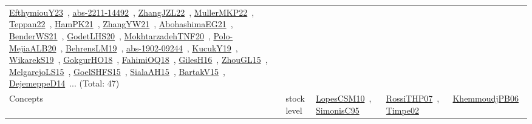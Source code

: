{\begin{longtable}{lp{3cm}>{\raggedright\arraybackslash}p{6cm}>{\raggedright\arraybackslash}p{6cm}>{\raggedright\arraybackslash}p{8cm}}
\href{works/EfthymiouY23.pdf}{EfthymiouY23}~\cite{EfthymiouY23}, \href{works/abs-2211-14492.pdf}{abs-2211-14492}~\cite{abs-2211-14492}, \href{works/ZhangJZL22.pdf}{ZhangJZL22}~\cite{ZhangJZL22}, \href{works/MullerMKP22.pdf}{MullerMKP22}~\cite{MullerMKP22}, \href{works/Teppan22.pdf}{Teppan22}~\cite{Teppan22}, \href{works/HamPK21.pdf}{HamPK21}~\cite{HamPK21}, \href{works/ZhangYW21.pdf}{ZhangYW21}~\cite{ZhangYW21}, \href{works/AbohashimaEG21.pdf}{AbohashimaEG21}~\cite{AbohashimaEG21}, \href{works/BenderWS21.pdf}{BenderWS21}~\cite{BenderWS21}, \href{works/GodetLHS20.pdf}{GodetLHS20}~\cite{GodetLHS20}, \href{works/MokhtarzadehTNF20.pdf}{MokhtarzadehTNF20}~\cite{MokhtarzadehTNF20}, \href{works/Polo-MejiaALB20.pdf}{Polo-MejiaALB20}~\cite{Polo-MejiaALB20}, \href{works/BehrensLM19.pdf}{BehrensLM19}~\cite{BehrensLM19}, \href{works/abs-1902-09244.pdf}{abs-1902-09244}~\cite{abs-1902-09244}, \href{works/KucukY19.pdf}{KucukY19}~\cite{KucukY19}, \href{works/WikarekS19.pdf}{WikarekS19}~\cite{WikarekS19}, \href{works/GokgurHO18.pdf}{GokgurHO18}~\cite{GokgurHO18}, \href{works/FahimiOQ18.pdf}{FahimiOQ18}~\cite{FahimiOQ18}, \href{works/GilesH16.pdf}{GilesH16}~\cite{GilesH16}, \href{works/ZhouGL15.pdf}{ZhouGL15}~\cite{ZhouGL15}, \href{works/MelgarejoLS15.pdf}{MelgarejoLS15}~\cite{MelgarejoLS15}, \href{works/GoelSHFS15.pdf}{GoelSHFS15}~\cite{GoelSHFS15}, \href{works/SialaAH15.pdf}{SialaAH15}~\cite{SialaAH15}, \href{works/BartakV15.pdf}{BartakV15}~\cite{BartakV15}, \href{works/DejemeppeD14.pdf}{DejemeppeD14}~\cite{DejemeppeD14}... (Total: 47)\\
Concepts & stock level & \href{works/LopesCSM10.pdf}{LopesCSM10}~\cite{LopesCSM10}, \href{works/SimonisC95.pdf}{SimonisC95}~\cite{SimonisC95} & \href{works/RossiTHP07.pdf}{RossiTHP07}~\cite{RossiTHP07}, \href{works/Timpe02.pdf}{Timpe02}~\cite{Timpe02} & \href{works/KhemmoudjPB06.pdf}{KhemmoudjPB06}~\cite{KhemmoudjPB06}\\

\end{longtable}}
